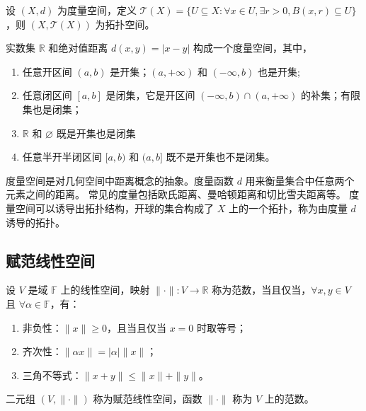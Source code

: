 \begin{proposition}[度量空间诱导的拓扑]
    设 $ (X,d) $ 为度量空间，定义 $ \mathcal{T}(X)=\{U\subseteq X:\forall x\in U,\exists r>0,B(x,r)\subseteq U\} $，则 $ (X,\mathcal{T}(X)) $ 为拓扑空间。
\end{proposition}
\vspace{1em}

\begin{example}
    实数集 $\mathbb{R}$ 和绝对值距离 $ d(x,y)=|x-y| $ 构成一个度量空间，其中，
    \begin{enumerate}
        \item 任意开区间 $ (a,b) $ 是开集；$(a,+\infty)$ 和 $(-\infty,b)$ 也是开集;
        \item 任意闭区间 $ [a,b] $ 是闭集，它是开区间 $(-\infty,b)\cap(a,+\infty)$ 的补集；有限集也是闭集；
        \item $\mathbb{R}$ 和 $\varnothing$ 既是开集也是闭集
        \item 任意半开半闭区间 $ [a,b) $ 和 $ (a,b] $ 既不是开集也不是闭集。
    \end{enumerate}
\end{example}

\vspace{1em}

\begin{note}
    度量空间是对几何空间中距离概念的抽象。度量函数 $ d $ 用来衡量集合中任意两个元素之间的距离。
    常见的度量包括欧氏距离、曼哈顿距离和切比雪夫距离等。
    度量空间可以诱导出拓扑结构，开球的集合构成了 $ X $ 上的一个拓扑，称为由度量 $ d $ 诱导的拓扑。
\end{note}

\vspace{1em}
\subsection{赋范线性空间}

\begin{definition}
    设 $ V $ 是域 $ \mathbb{F} $ 上的线性空间，映射 $ \|\cdot\|:V\to \mathbb{R} $ 称为范数，当且仅当，$ \forall x,y\in V $ 且 $ \forall \alpha\in \mathbb{F} $，有：
    \begin{enumerate}
        \item 非负性：$ \|x\|\geq 0 $，且当且仅当 $ x=0 $ 时取等号；
        \item 齐次性：$ \|\alpha x\|=|\alpha|\|x\| $；
        \item 三角不等式：$ \|x+y\|\leq \|x\|+\|y\| $。
    \end{enumerate}
    二元组 $ (V,\|\cdot\|) $ 称为赋范线性空间，函数 $ \|\cdot\| $ 称为 $ V $ 上的范数。
\end{definition}

